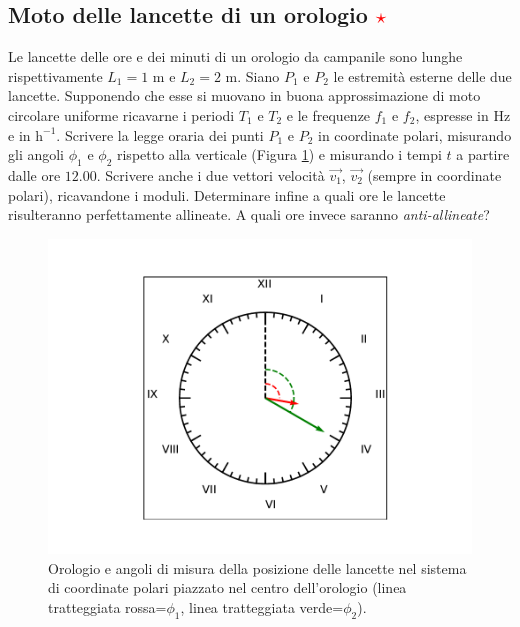 \documentclass[12pt,a4paper]{book}
\newcommand{\rstar}{ \textcolor{red}{$\star$}}
\begin{document}
\subsection{Moto delle lancette di un orologio \rstar}
Le lancette delle ore e dei minuti di un orologio da campanile sono lunghe rispettivamente $L_1=1$ m e $L_2=2$ m. Siano $P_1$ e $P_2$ le estremità esterne delle due lancette. Supponendo che esse si muovano in buona approssimazione di moto circolare uniforme ricavarne i periodi $T_1$ e $T_2$ e le frequenze
$f_1$ e $f_2$, espresse in Hz e in $\text{h}^{-1}$. Scrivere la legge oraria dei punti $P_1$ e $P_2$ in coordinate polari, misurando gli angoli $\phi_1$ e $\phi_2$ rispetto alla verticale (Figura \ref{fig:orologio1}) e misurando i tempi $t$ a partire dalle ore $12.00$. Scrivere anche i due vettori velocità $\vec{v_1}$, $\vec{v_2}$ (sempre in coordinate polari), ricavandone i moduli. Determinare infine a quali ore le lancette risulteranno perfettamente allineate. A quali ore invece saranno \textit{anti-allineate}?
 \begin{figure}[!ht]
 \centering
\includegraphics[scale=0.55]{orologio1.pdf}
\caption{Orologio e angoli di misura della posizione delle lancette nel sistema di coordinate polari piazzato nel centro dell'orologio (linea tratteggiata rossa=$\phi_1$, linea tratteggiata verde=$\phi_2$). \label{fig:orologio1} }
\end{figure}
\end{document}
